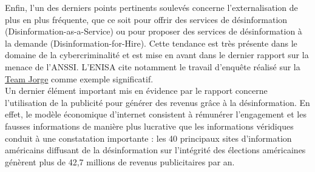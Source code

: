 \documentclass[a4paper]{article}
\begin{document}
Enfin, l'un des derniers points pertinents soulevés concerne l'externalisation de plus en plus fréquente, que ce soit pour offrir des services de désinformation (Disinformation-as-a-Service) ou pour proposer des services de désinformation à la demande (Disinformation-for-Hire). Cette tendance est très présente dans le domaine de la cybercriminalité et est mise en avant dans le dernier rapport sur la menace de l'ANSSI. L'ENISA cite notamment le travail d'enquête réalisé sur la \href{https://www.theguardian.com/world/2023/feb/15/aims-software-avatars-team-jorge-disinformation-fake-profiles}{Team Jorge} comme exemple significatif.
\\

Un dernier élément important mis en évidence par le rapport concerne l'utilisation de la publicité pour générer des revenus grâce à la désinformation. En effet, le modèle économique d'internet consistent à rémunérer l'engagement et les fausses informations de manière plus lucrative que les informations véridiques conduit à une constatation importante : les 40 principaux sites d'information américains diffusant de la désinformation sur l'intégrité des élections américaines génèrent plus de 42,7 millions de revenus publicitaires par an.
\end{document}
